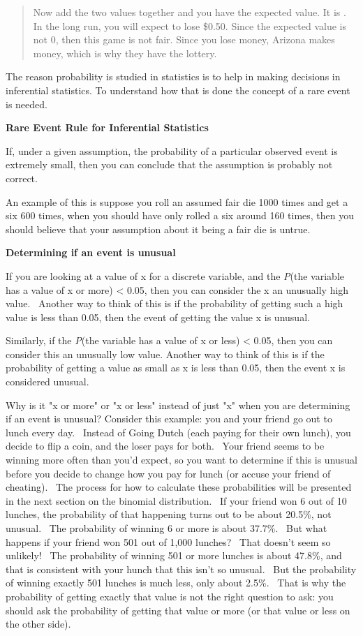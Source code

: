 \documentclass[]{book}
\begin{document}
\begin{quote}
Now add the two values together and you have the expected value. It is
. In the long run, you will expect to lose \$0.50. Since the expected
value is not 0, then this game is not fair. Since you lose money,
Arizona makes money, which is why they have the lottery.
\end{quote}

The reason probability is studied in statistics is to help in making
decisions in inferential statistics. To understand how that is done the
concept of a rare event is needed.

\textbf{Rare Event Rule for Inferential Statistics}

If, under a given assumption, the probability of a particular observed
event is extremely small, then you can conclude that the assumption is
probably not correct.

An example of this is suppose you roll an assumed fair die 1000 times
and get a six 600 times, when you should have only rolled a six around
160 times, then you should believe that your assumption about it being a
fair die is untrue.

\textbf{Determining if an event is unusual}

If you are looking at a value of x for a discrete variable, and the
\emph{P}(the variable has a value of x or more) \textless{} 0.05, then you can
consider the x an unusually high value.~ Another way to think of this is
if the probability of getting such a high value is less than 0.05, then
the event of getting the value x is unusual.

Similarly, if the \emph{P}(the variable has a value of x or less) \textless{} 0.05,
then you can consider this an unusually low value. Another way to think
of this is if the probability of getting a value as small as x is less
than 0.05, then the event x is considered unusual.

Why is it "x or more" or "x or less" instead of just "x" when you
are determining if an event is unusual? Consider this example: you and
your friend go out to lunch every day.~ Instead of Going Dutch (each
paying for their own lunch), you decide to flip a coin, and the loser
pays for both.~ Your friend seems to be winning more often than you'd
expect, so you want to determine if this is unusual before you decide to
change how you pay for lunch (or accuse your friend of cheating).~ The
process for how to calculate these probabilities will be presented in
the next section on the binomial distribution.~ If your friend won 6 out
of 10 lunches, the probability of that happening turns out to be about
20.5\%, not unusual.~ The probability of winning 6 or more is about
37.7\%.~ But what happens if your friend won 501 out of 1,000 lunches?~
That doesn't seem so unlikely!~ The probability of winning 501 or more
lunches is about 47.8\%, and that is consistent with your hunch that this
isn't so unusual.~ But the probability of winning exactly 501 lunches
is much less, only about 2.5\%.~ That is why the probability of getting
exactly that value is not the right question to ask: you should ask the
probability of getting that value or more (or that value or less on the
other side).
\end{document}
